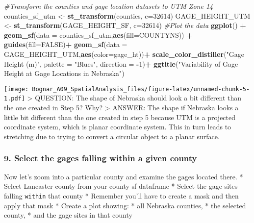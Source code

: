 \documentclass[]{article}
\newenvironment{Shaded}{\begin{snugshade}}{\end{snugshade}}
\newcommand{\KeywordTok}[1]{\textcolor[rgb]{0.13,0.29,0.53}{\textbf{#1}}}
\newcommand{\DataTypeTok}[1]{\textcolor[rgb]{0.13,0.29,0.53}{#1}}
\newcommand{\DecValTok}[1]{\textcolor[rgb]{0.00,0.00,0.81}{#1}}
\newcommand{\StringTok}[1]{\textcolor[rgb]{0.31,0.60,0.02}{#1}}
\newcommand{\CommentTok}[1]{\textcolor[rgb]{0.56,0.35,0.01}{\textit{#1}}}
\newcommand{\OtherTok}[1]{\textcolor[rgb]{0.56,0.35,0.01}{#1}}
\newcommand{\OperatorTok}[1]{\textcolor[rgb]{0.81,0.36,0.00}{\textbf{#1}}}
\newcommand{\NormalTok}[1]{#1}
\begin{document}
\begin{Shaded}
\begin{Highlighting}[]
\CommentTok{#Transform the counties and gage location datasets to UTM Zone 14}
\NormalTok{counties_sf_utm <-}\StringTok{ }\KeywordTok{st_transform}\NormalTok{(counties, }\DataTypeTok{c=}\DecValTok{32614}\NormalTok{)}
\NormalTok{GAGE_HEIGHT_UTM <-}\StringTok{  }\KeywordTok{st_transform}\NormalTok{(GAGE_HEIGHT_SF, }\DataTypeTok{c=}\DecValTok{32614}\NormalTok{)}
\CommentTok{#Plot the data}
\KeywordTok{ggplot}\NormalTok{() }\OperatorTok{+}\StringTok{ }
\StringTok{  }\KeywordTok{geom_sf}\NormalTok{(}\DataTypeTok{data =}\NormalTok{ counties_sf_utm,}\KeywordTok{aes}\NormalTok{(}\DataTypeTok{fill=}\NormalTok{COUNTYNS)) }\OperatorTok{+}\StringTok{ }
\StringTok{  }\KeywordTok{guides}\NormalTok{(}\DataTypeTok{fill=}\OtherTok{FALSE}\NormalTok{)}\OperatorTok{+}
\StringTok{   }\KeywordTok{geom_sf}\NormalTok{(}\DataTypeTok{data =}\NormalTok{ GAGE_HEIGHT_UTM,}\KeywordTok{aes}\NormalTok{(}\DataTypeTok{color=}\NormalTok{gage_ht))}\OperatorTok{+}
\StringTok{   }\KeywordTok{scale_color_distiller}\NormalTok{(}\StringTok{"Gage Height (m)"}\NormalTok{, }\DataTypeTok{palette =} \StringTok{"Blues"}\NormalTok{, }\DataTypeTok{direction =} \OperatorTok{-}\DecValTok{1}\NormalTok{)}\OperatorTok{+}
\StringTok{  }\KeywordTok{ggtitle}\NormalTok{(}\StringTok{"Variability of Gage Height at Gage Locations in Nebraska"}\NormalTok{)}
\end{Highlighting}
\end{Shaded}

\texttt{[image: Bognar\_A09\_SpatialAnalysis\_files/figure-latex/unnamed-chunk-5-1.pdf]}
\textgreater{} QUESTION: The shape of Nebraska should look a bit
different than the one created in Step 5? Why? \textgreater{} ANSWER:
The shape if Nebraska looks a little bit different than the one created
in step 5 because UTM is a projected coordinate system, which is planar
coordinate system. This in turn leads to stretching due to trying to
convert a circular object to a planar surface.

\subsubsection{9. Select the gages falling within a given
county}\label{select-the-gages-falling-within-a-given-county}

Now let's zoom into a particular county and examine the gages located
there. * Select Lancaster county from your county sf dataframe * Select
the gage sites falling \texttt{within} that county * Remember you'll
have to create a mask and then apply that mask * Create a plot showing:
* all Nebraska counties, * the selected county, * and the gage sites in
that county
\end{document}
